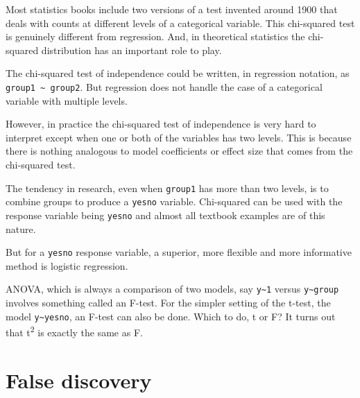 \documentclass[
  letterpaper,
  DIV=11,
  numbers=noendperiod,
  oneside]{scrreprt}
\begin{document}
\begin{tcolorbox}[enhanced jigsaw, colbacktitle=quarto-callout-warning-color!10!white, breakable, opacitybacktitle=0.6, colback=white, left=2mm, arc=.35mm, colframe=quarto-callout-warning-color-frame, coltitle=black, toprule=.15mm, opacityback=0, leftrule=.75mm, bottomtitle=1mm, toptitle=1mm, titlerule=0mm, title=\textcolor{quarto-callout-warning-color}{\faExclamationTriangle}\hspace{0.5em}{The chi-squared test}, rightrule=.15mm, bottomrule=.15mm]

Most statistics books include two versions of a test invented around
1900 that deals with counts at different levels of a categorical
variable. This chi-squared test is genuinely different from regression.
And, in theoretical statistics the chi-squared distribution has an
important role to play.

The chi-squared test of independence could be written, in regression
notation, as \texttt{group1\ \textasciitilde{}\ group2}. But regression
does not handle the case of a categorical variable with multiple levels.

However, in practice the chi-squared test of independence is very hard
to interpret except when one or both of the variables has two levels.
This is because there is nothing analogous to model coefficients or
effect size that comes from the chi-squared test.

The tendency in research, even when \texttt{group1} has more than two
levels, is to combine groups to produce a \texttt{yesno} variable.
Chi-squared can be used with the response variable being \texttt{yesno}
and almost all textbook examples are of this nature.

But for a \texttt{yesno} response variable, a superior, more flexible
and more informative method is logistic regression.

\end{tcolorbox}

ANOVA, which is always a comparison of two models, say
\texttt{y\textasciitilde{}1} versus \texttt{y\textasciitilde{}group}
involves something called an F-test. For the simpler setting of the
t-test, the model \texttt{y\textasciitilde{}yesno}, an F-test can also
be done. Which to do, t or F? It turns out that t\textsuperscript{2} is
exactly the same as F.

\hypertarget{sec-lesson-38}{%
\chapter{False discovery}\label{sec-lesson-38}}
\end{document}
